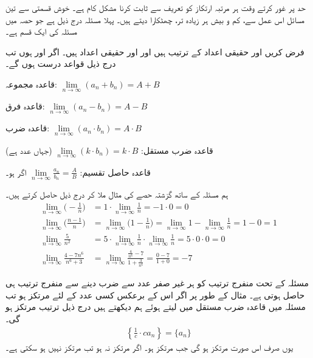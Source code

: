 
حد پر غور کرتے وقت ہر مرتبہ ارتکاز کو تعریف سے ثابت کرنا مشکل کام ہے۔ خوش قسمتی سے تین مسائل اس عمل سے، کم و بیش ہر  زیادہ تر، چھٹکارا دیتے ہیں۔ پہلا مسئلہ درج ذیل ہے جو حصہ  میں مسئلہ  کی ایک قسم ہے۔

فرض کریں  اور  حقیقی اعداد کے ترتیب ہیں اور  اور  حقیقی اعداد ہیں۔ اگر  اور  ہوں تب درج ذیل قواعد درست ہوں گے۔
\begin{description}
\item{قاعدہ مجموعہ:}\quad
$\lim\limits_{n\to \infty}(a_n+b_n)=A+B$
\item{قاعدہ فرق:}\quad
$\lim\limits_{n\to\infty}(a_n-b_n)=A-B$
\item{قاعدہ ضرب:}\quad
$\lim\limits_{n\to\infty}(a_n\cdot b_n)=A\cdot B$
\item{قاعدہ ضرب مستقل:}\quad
$\lim\limits_{n\to\infty}(k\cdot b_n)=k\cdot B$\quad
(جہاں  عدد ہے)
\item{قاعدہ حاصل تقسیم:}\quad
$\lim\limits_{n\to\infty}\frac{a_n}{b_n}=\frac{A}{B}$\quad
اگر  ہو۔
\end{description}

ہم مسئلہ  کے ساتھ گزشتہ حصے کی مثال  ملا کر درج ذیل حاصل کرتے ہیں۔
\begin{align*}
\lim_{n\to\infty}\big(-\frac{1}{n}\big)&=1\cdot\lim_{n\to\infty}\frac{1}{n}=-1\cdot0=0\\
\lim_{n\to\infty}\big(\frac{n-1}{n}\big)&=\lim_{n\to\infty}\big(1-\frac{1}{n}\big)=\lim_{n\to\infty} 1-\lim_{n\to\infty}\frac{1}{n}=1-0=1\\
\lim_{n\to\infty}\frac{5}{n^2}&=5\cdot\lim_{n\to\infty}\frac{1}{n}\cdot\lim_{n\to\infty}\frac{1}{n}=5\cdot 0\cdot 0=0\\
\lim_{n\to\infty}\frac{4-7n^6}{n^6+3}&=\lim_{n\to\infty}\frac{\tfrac{4}{n^6}-7}{1+\tfrac{3}{n^6}}=\frac{0-7}{1+0}=-7
\end{align*}

مسئلہ  کے تحت منفرج ترتیب  کو ہر غیر صفر عدد سے ضرب دینے سے منفرج ترتیب ہی حاصل ہوتی ہے۔ مثال کے طور پر اگر اس کے برعکس کسی عدد  کے لئے   مرتکز ہو تب  مسئلہ  میں قاعدہ ضرب مستقل میں  لیتے ہوئے ہم دیکھتے ہیں درج ذیل ترتیب مرتکز ہو گی۔
\begin{align*}
\left\{\frac{1}{c}\cdot ca_n\right\}=\{a_n\}
\end{align*}
یوں  صرف اس صورت مرتکز ہو گی جب  مرتکز ہو۔ اگر  مرتکز نہ ہو تب  مرتکز نہیں ہو سکتی ہے۔

